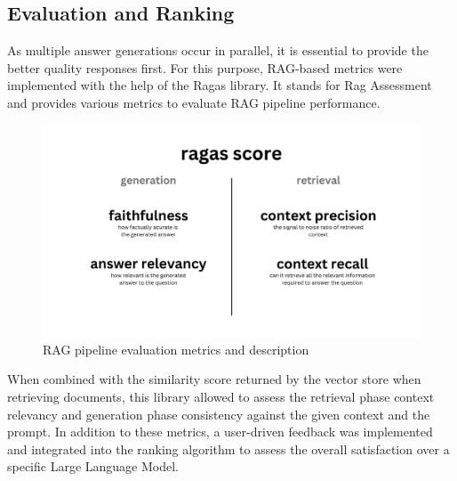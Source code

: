 \subsection{Evaluation and Ranking}
As multiple answer generations occur in parallel, it is essential to provide the better quality responses first. For this purpose, RAG-based metrics were implemented with the help of the Ragas library. It stands for Rag Assessment and provides various metrics to evaluate RAG pipeline performance.
\begin{figure}[H]
    \centering
    \includegraphics[width=\linewidth]{./figures/ragas-metrics.png}
    \caption{RAG pipeline evaluation metrics and description}
\end{figure}
When combined with the similarity score returned by the vector store when retrieving documents, this library allowed to assess the retrieval phase context relevancy and generation phase consistency against the given context and the prompt.
In addition to these metrics, a user-driven feedback was implemented and integrated into the ranking algorithm to assess the overall satisfaction over a specific Large Language Model.
